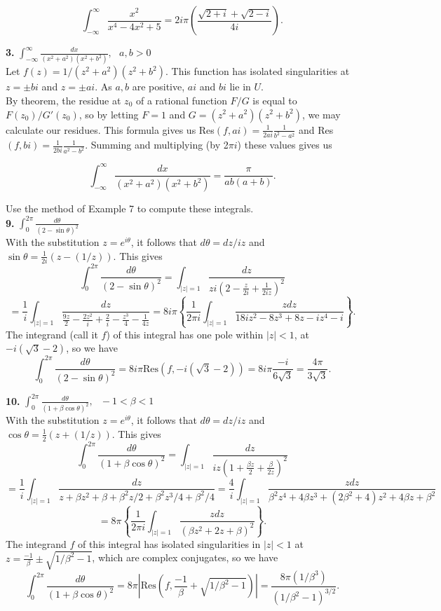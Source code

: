 \documentclass[12pt,letterpaper]{article}
\begin{document}
\[\int_{-\infty}^{\infty} \frac{x^{2}}{x^{4}-4x^{2}+5} = 2i\pi\left(\frac{\sqrt{2+i}+\sqrt{2-i}}{4i}\right).\]

\textbf{3.} \(\int_{-\infty}^{\infty} \frac{dx}{(x^{2}+a^{2})(x^{2}+b^{2})}, \text{ }a,b > 0\)\\

Let \(f(z) = 1/(z^{2}+a^{2})(z^{2}+b^{2})\). This function has isolated singularities at \(z = \pm bi\) and \(z = \pm ai\). As \(a,b\) are positive, \(ai\) and \(bi\) lie in \(U\). \\

By theorem, the residue at \(z_{0}\) of a rational function \(F/G\) is equal to \(F(z_{0})/G'(z_{0})\), so by letting \(F=1\) and \(G=(z^{2}+a^{2})(z^{2}+b^{2})\), we may calculate our residues. This formula gives us Res\((f, ai) = \frac{1}{2ai}\frac{1}{b^{2}-a^{2}}\) and Res\((f, bi) = \frac{1}{2bi}\frac{1}{a^{2}-b^{2}}\). Summing and multiplying (by 2\(\pi i\)) these values gives us

\[\int_{-\infty}^{\infty} \frac{dx}{(x^{2}+a^{2})(x^{2}+b^{2})} = \frac{\pi}{ab(a+b)}.\]

Use the method of Example 7 to compute these integrals. \\

\textbf{9.} \(\int_{0}^{2\pi} \frac{d\theta}{(2-\sin\theta)^{2}}\)\\

With the substitution \(z = e^{i\theta}\), it follows that \(d\theta = dz/iz\) and \(\sin\theta = \frac{1}{2i}(z-(1/z))\). This gives \[\int_{0}^{2\pi}\frac{d\theta}{(2-\sin\theta)^{2}} = \int_{|z|=1} \frac{dz}{zi(2-\frac{z}{2i}+\frac{1}{2iz})^{2}}\] \[= \frac{1}{i}\int_{|z|=1} \frac{dz}{\frac{9z}{2} - \frac{2z^{2}}{i} + \frac{2}{i} -\frac{z^{3}}{4} - \frac{1}{4z}} = 8i\pi\left\{\frac{1}{2\pi i}\int_{|z| = 1} \frac{zdz}{18iz^{2} - 8z^{3} + 8z - iz^{4} - i }\right\}.\] The integrand (call it \(f\)) of this integral has one pole within \(|z| < 1\), at \(-i(\sqrt{3}-2)\), so we have \[\int_{0}^{2\pi} \frac{d\theta}{(2-\sin\theta)^{2}} = 8i\pi\text{Res}(f, -i(\sqrt{3}-2)) = 8i\pi \frac{-i}{6\sqrt{3}} = \frac{4\pi}{3\sqrt{3}}.\]

\textbf{10.} \(\int_{0}^{2\pi} \frac{d\theta}{(1+\beta\cos\theta)^{2}}, \text{ }-1<\beta<1\) \\

With the substitution \(z = e^{i\theta}\), it follows that \(d\theta = dz/iz\) and \(\cos\theta = \frac{1}{2}(z+(1/z))\). This gives \[\int_{0}^{2\pi} \frac{d\theta}{(1+\beta\cos\theta)^{2}} = \int_{|z|=1} \frac{dz}{iz(1+\frac{\beta z}{2} + \frac{\beta}{2z})^{2}}\] \[=\frac{1}{i}\int_{|z|=1} \frac{dz}{z+\beta z^{2} + \beta + \beta^{2}z/2 + \beta^{2} z^{3}/4 + \beta^{2}/4} = \frac{4}{i} \int_{|z|=1} \frac{zdz}{\beta^{2}z^{4} + 4\beta z^{3} + (2\beta^{2} + 4)z^{2} + 4\beta z + \beta^{2}}\] \[= 8\pi \left\{ \frac{1}{2\pi i} \int_{|z| = 1} \frac{zdz}{(\beta z^{2} + 2z + \beta)^{2}}\right\}.\] The integrand \(f\) of this integral has isolated singularities in \(|z| < 1\) at \(z = \frac{-1}{\beta} \pm \sqrt{1/\beta^{2} - 1}\), which are complex conjugates, so we have \[\int_{0}^{2\pi} \frac{d\theta}{(1+\beta\cos\theta)^{2}} = 8\pi |\text{Res}(f, \frac{-1}{\beta} + \sqrt{1/\beta^{2} - 1})| = \frac{8\pi (1/\beta^{3})}{(1/\beta^{2} - 1)^{3/2}}.  \]
\end{document}
